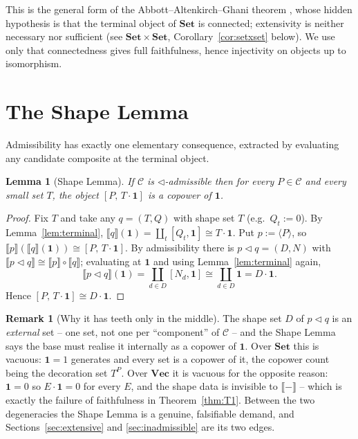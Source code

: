 \documentclass[11pt]{amsart}
\theoremstyle{plain}
\newtheorem{lemma}[theorem]{Lemma}
\theoremstyle{definition}
\newtheorem{remark}[theorem]{Remark}
\newcommand{\C}{\mathcal{C}}
\newcommand{\ext}[1]{\llbracket #1 \rrbracket}
\newcommand{\Setb}{\mathbf{Set}}
\newcommand{\Vecb}{\mathbf{Vec}}
\newcommand{\comp}{\mathbin{\triangleleft}}
\newcommand{\one}{\mathbf{1}}
\newcommand{\gena}[1]{\langle #1 \rangle}
\begin{document}
This is the general form of the Abbott--Altenkirch--Ghani theorem \cite{AAG}, whose hidden hypothesis
is that the terminal object of $\Setb$ is connected; extensivity is neither necessary nor sufficient
(see $\Setb\times\Setb$, Corollary~\ref{cor:setxset} below). We use only that connectedness gives
full faithfulness, hence injectivity on objects up to isomorphism.

\section{The Shape Lemma}\label{sec:shape}

Admissibility has exactly one elementary consequence, extracted by evaluating any candidate
composite at the terminal object.

\begin{lemma}[Shape Lemma]\label{lem:shape}
If $\C$ is $\comp$-admissible then for every $P\in\C$ and every small set $T$, the object
$[P,\,T\cdot\one]$ is a copower of $\one$.
\end{lemma}
\begin{proof}
Fix $T$ and take any $q=(T,Q)$ with shape set $T$ (e.g.\ $Q_t:=0$). By Lemma~\ref{lem:terminal},
$\ext q(\one)=\coprod_{t}[Q_t,\one]\cong T\cdot\one$. Put $p:=\gena{P}$, so
$\ext p(\ext q(\one))\cong[P,\,T\cdot\one]$. By admissibility there is $p\comp q=(D,N)$ with
$\ext{p\comp q}\cong\ext p\circ\ext q$; evaluating at $\one$ and using Lemma~\ref{lem:terminal}
again,
\[
   \ext{p\comp q}(\one)=\coprod_{d\in D}[N_d,\one]\cong\coprod_{d\in D}\one=D\cdot\one .
\]
Hence $[P,\,T\cdot\one]\cong D\cdot\one$.
\end{proof}

\begin{remark}[Why it has teeth only in the middle]\label{rem:teeth}
The shape set $D$ of $p\comp q$ is an \emph{external} set -- one set, not one per ``component'' of
$\C$ -- and the Shape Lemma says the base must realise it internally as a copower of $\one$. Over
$\Setb$ this is vacuous: $\one=1$ generates and every set is a copower of it, the copower count being
the decoration set $T^{P}$. Over $\Vecb$ it is vacuous for the opposite reason: $\one=0$ so
$E\cdot\one=0$ for every $E$, and the shape data is invisible to $\ext{-}$ -- which is exactly the
failure of faithfulness in Theorem~\ref{thm:T1}. Between the two degeneracies the Shape Lemma is a
genuine, falsifiable demand, and Sections~\ref{sec:extensive} and \ref{sec:inadmissible} are its two
edges.
\end{remark}
\end{document}
